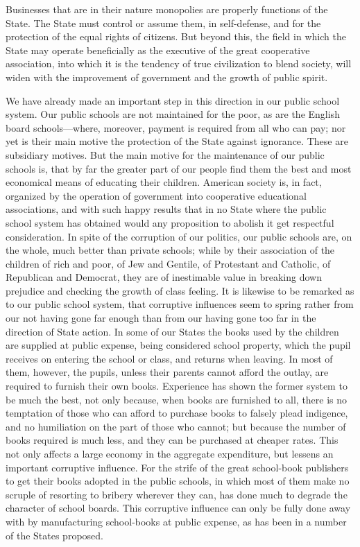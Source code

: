 \documentclass{book}
\begin{document}
Businesses that are in their nature monopolies are properly functions of the State. The State must control or assume them, in self-defense, and for the protection of the equal rights of citizens. But beyond this, the field in which the State may operate beneficially as the executive of the great cooperative association, into which it is the tendency of true civilization to blend society, will widen with the improvement of government and the growth of public spirit.

We have already made an important step in this direction in our public school system. Our public schools are not maintained for the poor, as are the English board schools—where, moreover, payment is required from all who can pay; nor yet is their main motive the protection of the State against ignorance. These are subsidiary motives. But the main motive for the maintenance of our public schools is, that by far the greater part of our people find them the best and most economical means of educating their children. American society is, in fact, organized by the operation of government into cooperative educational associations, and with such happy results that in no State where the public school system has obtained would any proposition to abolish it get respectful consideration. In spite of the corruption of our politics, our public schools are, on the whole, much better than private schools; while by their association of the children of rich and poor, of Jew and Gentile, of Protestant and Catholic, of Republican and Democrat, they are of inestimable value in breaking down prejudice and checking the growth of class feeling. It is likewise to be remarked as to our public school system, that corruptive influences seem to spring rather from our not having gone far enough than from our having gone too far in the direction of State action. In some of our States the books used by the children are supplied at public expense, being considered school property, which the pupil receives on entering the school or class, and returns when leaving. In most of them, however, the pupils, unless their parents cannot afford the outlay, are required to furnish their own books. Experience has shown the former system to be much the best, not only because, when books are furnished to all, there is no temptation of those who can afford to purchase books to falsely plead indigence, and no humiliation on the part of those who cannot; but because the number of books required is much less, and they can be purchased at cheaper rates. This not only affects a large economy in the aggregate expenditure, but lessens an important corruptive influence. For the strife of the great school-book publishers to get their books adopted in the public schools, in which most of them make no scruple of resorting to bribery wherever they can, has done much to degrade the character of school boards. This corruptive influence can only be fully done away with by manufacturing school-books at public expense, as has been in a number of the States proposed.
\end{document}
